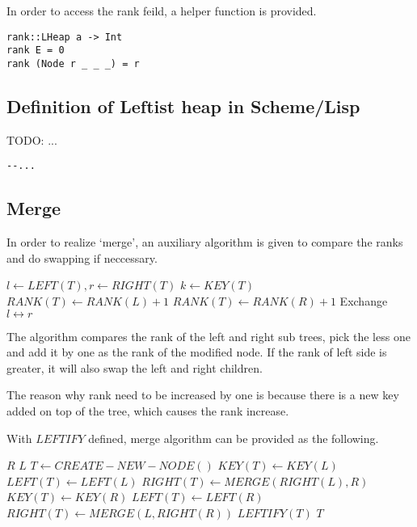 \documentclass{article}
\begin{document}
In order to access the rank feild, a helper function is provided.

\begin{lstlisting}
rank::LHeap a -> Int
rank E = 0
rank (Node r _ _ _) = r
\end{lstlisting}

\subsection*{Definition of Leftist heap in Scheme/Lisp}

TODO: ...

\lstset{language=lisp}
\begin{lstlisting}
--...
\end{lstlisting}

\subsection{Merge}

In order to realize `merge', an auxiliary algorithm is given to 
compare the ranks and do swapping if neccessary.

\begin{algorithmic}[1]
  \State $l \gets LEFT(T), r \gets RIGHT(T)$
  \State $k \gets KEY(T)$
    \State $RANK(T) \gets RANK(L) + 1$
  \Else
    \State $RANK(T) \gets RANK(R) + 1$
    \State Exchange $l \leftrightarrow r$
  \EndIf
\EndFunction
\end{algorithmic}

The algorithm compares the rank of the left and
right sub trees, pick the less one and add it by one as the 
rank of the modified node. If the rank of left side is greater,
it will also swap the left and right children.

The reason why rank need to be increased by one is because there
is a new key added on top of the tree, which causes the rank 
increase.

With $LEFTIFY$ defined, merge algorithm can be provided as the
following.

\begin{algorithmic}[1]
    \State \Return $R$
    \State \Return $L$
  \Else
    \State $T \gets CREATE-NEW-NODE()$
      \State $KEY(T) \gets KEY(L)$
      \State $LEFT(T) \gets LEFT(L)$
      \State $RIGHT(T) \gets MERGE(RIGHT(L), R)$
    \Else
      \State $KEY(T) \gets KEY(R)$
      \State $LEFT(T) \gets LEFT(R)$
      \State $RIGHT(T) \gets MERGE(L, RIGHT(R))$
    \EndIf
    \State $LEFTIFY(T)$
  \EndIf
  \State \Return $T$
\EndFunction
\end{algorithmic}
\end{document}
